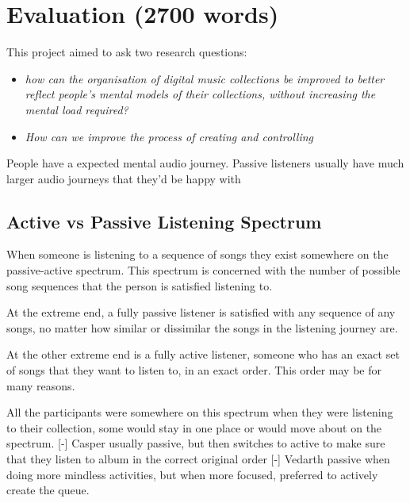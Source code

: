 \chapter{Evaluation (2700 words)}
This project aimed to ask two research questions:\begin{itemize}
    \item \textit{how can the organisation of digital music collections be improved to better reflect people's mental models of their collections, without increasing the mental load required?}
    \item \textit{How can we improve the process of creating and controlling}
\end{itemize}

People have a expected mental audio journey. Passive listeners usually have much larger audio journeys that they'd be happy with

\section{Active vs Passive Listening Spectrum}
When someone is listening to a sequence of songs they exist somewhere on the passive-active spectrum. This spectrum is concerned with the number of possible song sequences that the person is satisfied listening to.

At the extreme end, a fully passive listener is satisfied with any sequence of any songs, no matter how similar or dissimilar the songs in the listening journey are.

At the other extreme end is a fully active listener, someone who has an exact set of songs that they want to listen to, in an exact order. This order may be for many reasons.

All the participants were somewhere on this spectrum when they were listening to their collection, some would stay in one place or would move about on the spectrum.
[-] Casper usually passive, but then switches to active to make sure that they listen to album in the correct original order
[-] Vedarth passive when doing more mindless activities, but when more focused, preferred to actively create the queue.

